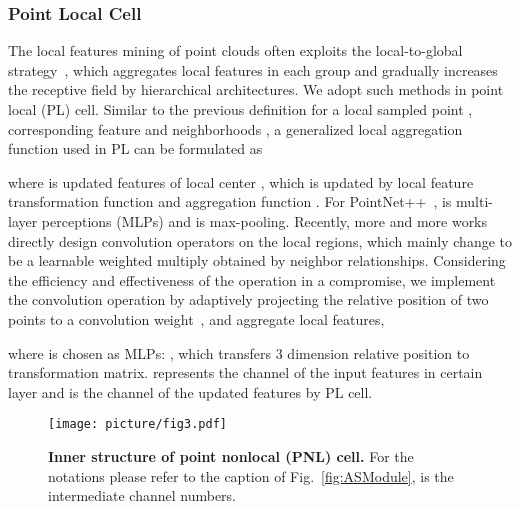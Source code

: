 \documentclass[10pt,twocolumn,letterpaper]{article}
\begin{document}
	\subsubsection{Point Local Cell} 
	
	The local features mining of point clouds often exploits the local-to-global strategy~\cite{pointnet2}, which aggregates local features in each group and gradually increases the receptive field by hierarchical architectures. We adopt such methods in point local (PL) cell. Similar to the previous definition for a local sampled point , corresponding feature  and neighborhoods , a generalized local aggregation function used in PL can be formulated as
	
	
	where  is updated features of local center , which is updated by local feature transformation function  and aggregation function . For PointNet++~\cite{pointnet2},  is multi-layer perceptions (MLPs) and  is max-pooling. Recently, more and more works directly design convolution operators on the local regions, which mainly change  to be a learnable weighted multiply obtained by neighbor relationships. Considering the efficiency and effectiveness of the operation in a compromise, we implement the convolution operation by adaptively projecting the relative position of two points to a convolution weight~\cite{PCCN,PointConv}, and aggregate local features,
	
	where  is chosen as MLPs: , which transfers 3 dimension relative position to  transformation matrix.  represents the channel of the input features in certain layer and  is the channel of the updated features by PL cell.
	
	\begin{figure}
		\begin{center}
			\texttt{[image: picture/fig3.pdf]}
		\end{center}
		\caption{\textbf{Inner structure of point nonlocal (PNL) cell.} For the notations  please refer to the caption of Fig.~\ref{fig:ASModule},  is the intermediate channel numbers.}
		\label{fig:fig3NLC}
		\vspace{-0.3cm}
	\end{figure}
\end{document}
